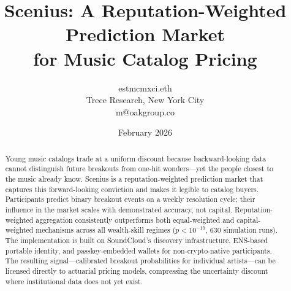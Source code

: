 \documentclass[9pt,oneside]{amsart}
\title[Scenius: Reputation-Weighted Prediction Markets for Music Catalog Pricing]{Scenius: A Reputation-Weighted Prediction Market\\ for Music Catalog Pricing}
\author{
  estmcmxci.eth\\
  Trece Research, New York City\\
  m@oakgroup.co
}
\date{February 2026}
\begin{document}
\begin{abstract}
Young music catalogs trade at a uniform discount because backward-looking data cannot distinguish future breakouts from one-hit wonders---yet the people closest to the music already know. Scenius is a reputation-weighted prediction market that captures this forward-looking conviction and makes it legible to catalog buyers. Participants predict binary breakout events on a weekly resolution cycle; their influence in the market scales with demonstrated accuracy, not capital. Reputation-weighted aggregation consistently outperforms both equal-weighted and capital-weighted mechanisms across all wealth-skill regimes ($p < 10^{-15}$, 630 simulation runs). The implementation is built on SoundCloud's discovery infrastructure, ENS-based portable identity, and passkey-embedded wallets for non-crypto-native participants. The resulting signal---calibrated breakout probabilities for individual artists---can be licensed directly to actuarial pricing models, compressing the uncertainty discount where institutional data does not yet exist.
\end{abstract}

\maketitle
\end{document}
